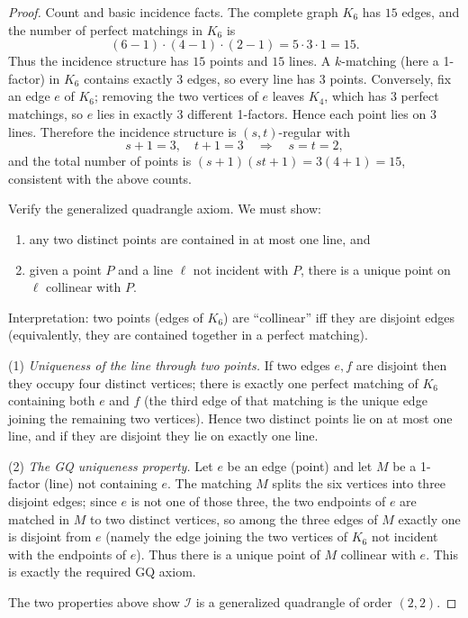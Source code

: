 \documentclass[12pt,a4paper,openany]{book}
\begin{document}
\begin{proof}
Count and basic incidence facts.  The complete graph $K_6$ has $15$ edges, and the number of perfect matchings in $K_6$ is
\[
(6-1)\cdot(4-1)\cdot(2-1)=5\cdot3\cdot1=15.
\]
Thus the incidence structure has $15$ points and $15$ lines.  A $k$-matching (here a 1-factor) in $K_6$ contains exactly $3$ edges, so every line has $3$ points.  Conversely, fix an edge $e$ of $K_6$; removing the two vertices of $e$ leaves $K_4$, which has $3$ perfect matchings, so $e$ lies in exactly $3$ different 1-factors.  Hence each point lies on $3$ lines.  Therefore the incidence structure is $(s,t)$-regular with
\[
s+1=3,\quad t+1=3\quad\Longrightarrow\quad s=t=2,
\]
and the total number of points is $(s+1)(st+1)=3(4+1)=15$, consistent with the above counts.

Verify the generalized quadrangle axiom.  We must show:
\begin{enumerate}
\item any two distinct points are contained in at most one line, and
\item given a point $P$ and a line $\ell$ not incident with $P$, there is a unique point on $\ell$ collinear with $P$.
\end{enumerate}

Interpretation: two points (edges of $K_6$) are ``collinear'' iff they are disjoint edges (equivalently, they are contained together in a perfect matching).  

(1) \emph{Uniqueness of the line through two points.}  If two edges $e,f$ are disjoint then they occupy four distinct vertices; there is exactly one perfect matching of $K_6$ containing both $e$ and $f$ (the third edge of that matching is the unique edge joining the remaining two vertices). Hence two distinct points lie on at most one line, and if they are disjoint they lie on exactly one line.

(2) \emph{The GQ uniqueness property.}  Let $e$ be an edge (point) and let $M$ be a 1-factor (line) not containing $e$. The matching $M$ splits the six vertices into three disjoint edges; since $e$ is not one of those three, the two endpoints of $e$ are matched in $M$ to two distinct vertices, so among the three edges of $M$ exactly one is disjoint from $e$ (namely the edge joining the two vertices of $K_6$ not incident with the endpoints of $e$). Thus there is a unique point of $M$ collinear with $e$. This is exactly the required GQ axiom.
\smallskip

The two properties above show $\mathcal{I}$ is a generalized quadrangle of order $(2,2)$.


\end{proof}
\end{document}
